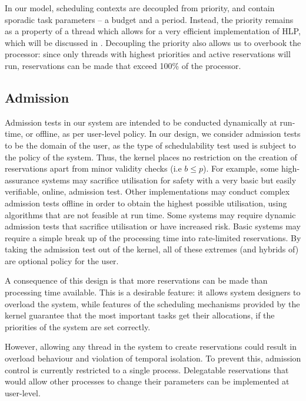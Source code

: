 In our model, scheduling contexts are decoupled from priority, and contain sporadic task parameters -- a budget and a period.
Instead, the priority remains as a property of a thread which allows for a very efficient implementation of \gls{HLP}, which will be discussed in .
Decoupling the priority also allows us to overbook the processor: since only threads with highest priorities and active reservations will run, reservations can be made that exceed 100\% of the processor.


\subsection{Admission}
\label{sec:model-admission}

Admission tests in our system are intended to be conducted dynamically at run-time, or offline, as per user-level policy.
In our design, we consider admission tests to be the domain of the user, as the type of schedulability test used is subject to the policy of the system.
Thus, the kernel places no restriction on the creation of reservations apart from minor validity checks (i.e $b \leq p$).
For example, some high-assurance systems may sacrifice utilisation for safety with a very basic but easily verifiable, online, admission test.
Other implementations may conduct complex admission tests offline in order to obtain the highest possible utilisation, using algorithms that are not feasible at run time.
Some systems may require dynamic admission tests that sacrifice utilisation or have increased risk.
Basic systems may require a simple break up of the processing time into rate-limited reservations.
By taking the admission test out of the kernel, all of these extremes (and hybrids of) are optional policy for the user.

A consequence of this design is that more reservations can be made than processing time available.
This is a desirable feature: it allows system designers to overload the system, while features of the scheduling mechanisms provided by the kernel guarantee that the most important tasks get their allocations, if the priorities of the system are set correctly.

However, allowing any thread in the system to create reservations could result in overload behaviour and violation of temporal isolation.
To prevent this, admission control is currently restricted to a single process.
Delegatable reservations that would allow other processes to change their parameters can be implemented at user-level.

